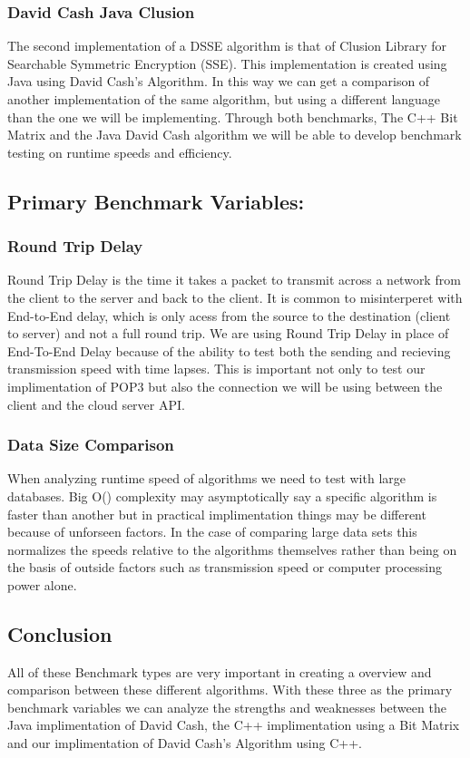 \subsubsection {David Cash Java Clusion}
	The second implementation of a DSSE algorithm is that of Clusion Library for Searchable Symmetric Encryption (SSE). This implementation is created using Java using David Cash’s Algorithm. In this way we can get a comparison of another implementation of the same algorithm, but using a different language than the one we will be implementing. Through both benchmarks, The C++ Bit Matrix and the Java David Cash algorithm we will be able to develop benchmark testing on runtime speeds and efficiency.

\subsection{ Primary Benchmark Variables: }
\subsubsection{ Round Trip Delay }
Round Trip Delay is the time it takes a packet to transmit across a network from the client to the server and back to the client. It is common to misinterperet with End-to-End delay, which is only acess from the source to the destination (client to server) and not a full round trip. We are using Round Trip Delay in place of End-To-End Delay because of the ability to test both the sending and recieving transmission speed with time lapses. This is important not only to test our implimentation of POP3 but also the connection we will be using between the client and the cloud server API.


\subsubsection{ Data Size Comparison }
When analyzing runtime speed of algorithms we need to test with large databases. Big O() complexity may asymptotically say a specific algorithm is faster than another but in practical implimentation things may be different because of unforseen factors. In the case of comparing large data sets this normalizes the speeds relative to the algorithms themselves rather than being on the basis of outside factors such as transmission speed or computer processing power alone.



\subsection{ Conclusion }
All of these Benchmark types are very important in creating a overview and comparison between these different algorithms. With these three as the primary benchmark variables we can analyze the strengths and weaknesses between the Java implimentation of David Cash, the C++ implimentation using a Bit Matrix and our implimentation of David Cash's Algorithm using C++.
